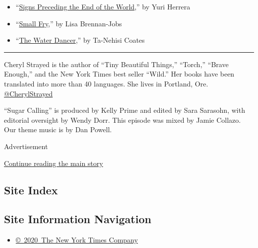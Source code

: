 \begin{itemize}
\item
  ``\href{https://www.amazon.com/dp/B00U58TZH6/ref=dp-kindle-redirect?_encoding=UTF8\&btkr=1}{Signs
  Preceding the End of the World},'' by Yuri Herrera
\item
  ``\href{https://groveatlantic.com/book/small-fry/}{Small Fry},'' by
  Lisa Brennan-Jobs
\item
  ``\href{https://www.penguinrandomhouse.com/books/550171/the-water-dancer-by-ta-nehisi-coates/}{The
  Water Dancer},'' by Ta-Nehisi Coates
\end{itemize}

\begin{center}\rule{0.5\linewidth}{\linethickness}\end{center}

Cheryl Strayed is the author of ``Tiny Beautiful Things,'' ``Torch,''
``Brave Enough,'' and the New York Times best seller ``Wild.'' Her books
have been translated into more than 40 languages. She lives in Portland,
Ore.
\href{https://twitter.com/CherylStrayed?ref_src=twsrc\%5Egoogle\%7Ctwcamp\%5Eserp\%7Ctwgr\%5Eauthor}{@CherylStrayed}

``Sugar Calling'' is produced by Kelly Prime and edited by Sara
Sarasohn, with editorial oversight by Wendy Dorr. This episode was mixed
by Jamie Collazo. Our theme music is by Dan Powell.

Advertisement

\protect\hyperlink{after-bottom}{Continue reading the main story}

\hypertarget{site-index}{%
\subsection{Site Index}\label{site-index}}

\hypertarget{site-information-navigation}{%
\subsection{Site Information
Navigation}\label{site-information-navigation}}

\begin{itemize}
\tightlist
\item
  \href{https://help.nytimes.com/hc/en-us/articles/115014792127-Copyright-notice}{©~2020~The
  New York Times Company}
\end{itemize}


